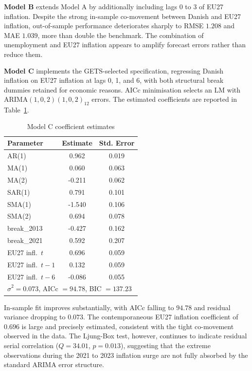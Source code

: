 \textbf{Model B} extends Model A by additionally including lags 0 to 3 of EU27 
inflation. Despite the strong in-sample co-movement between Danish and EU27 
inflation, out-of-sample performance deteriorates sharply to RMSE $1.208$ and 
MAE $1.039$, more than double the benchmark. The combination of unemployment 
and EU27 inflation appears to amplify forecast errors rather than reduce them.

\textbf{Model C} implements the GETS-selected specification, regressing Danish 
inflation on EU27 inflation at lags 0, 1, and 6, with both structural break 
dummies retained for economic reasons. AICc minimisation selects an LM with 
ARIMA$(1,0,2)(1,0,2)_{12}$ errors. The estimated coefficients are reported in 
Table~\ref{tab:modelC_coef}.

\begin{table}[H]
\centering
\caption{Model C coefficient estimates}
\begin{tabular}{lcc}
\hline
Parameter & Estimate & Std. Error \\
\hline
AR(1)            &  0.962 & 0.019 \\
MA(1)            &  0.060 & 0.063 \\
MA(2)            & -0.211 & 0.062 \\
SAR(1)           &  0.791 & 0.101 \\
SMA(1)           & -1.540 & 0.106 \\
SMA(2)           &  0.694 & 0.078 \\
break\_2013      & -0.427 & 0.162 \\
break\_2021      &  0.592 & 0.207 \\
EU27 infl.\ $t$  &  0.696 & 0.059 \\
EU27 infl.\ $t-1$ &  0.132 & 0.059 \\
EU27 infl.\ $t-6$ & -0.086 & 0.055 \\
\hline
\multicolumn{3}{l}{$\hat{\sigma}^2 = 0.073$, AICc $= 94.78$, BIC $= 137.23$} \\
\hline
\end{tabular}
\label{tab:modelC_coef}
\end{table}

In-sample fit improves substantially, with AICc falling to $94.78$ and 
residual variance dropping to $0.073$. The contemporaneous EU27 inflation 
coefficient of $0.696$ is large and precisely estimated, consistent with the 
tight co-movement observed in the data. The Ljung-Box test, however, continues 
to indicate residual serial correlation ($Q = 34.01$, $p = 0.013$), suggesting 
that the extreme observations during the 2021 to 2023 inflation surge are not 
fully absorbed by the standard ARIMA error structure.

